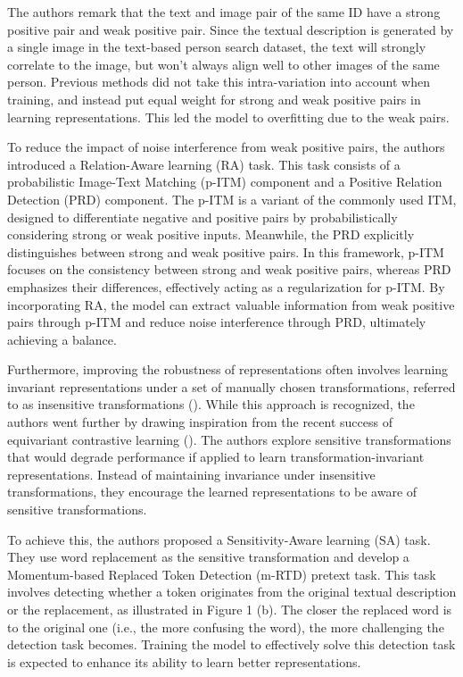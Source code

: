 The authors remark that the text and image pair of the same ID have a strong positive pair and weak positive pair. Since the textual description is generated by a single image in the text-based person search dataset, the text will strongly correlate to the image, but won't always align well to other images of the same person. Previous methods did not take this intra-variation into account when training, and instead put equal weight for strong and weak positive pairs in learning representations. This led the model to overfitting due to the weak pairs.

To reduce the impact of noise interference from weak positive pairs, the authors introduced a Relation-Aware learning (RA) task. This task consists of a probabilistic Image-Text Matching (p-ITM) component and a Positive Relation Detection (PRD) component. The p-ITM is a variant of the commonly used ITM, designed to differentiate negative and positive pairs by probabilistically considering strong or weak positive inputs. Meanwhile, the PRD explicitly distinguishes between strong and weak positive pairs. In this framework, p-ITM focuses on the consistency between strong and weak positive pairs, whereas PRD emphasizes their differences, effectively acting as a regularization for p-ITM. By incorporating RA, the model can extract valuable information from weak positive pairs through p-ITM and reduce noise interference through PRD, ultimately achieving a balance.

Furthermore, improving the robustness of representations often involves learning invariant representations under a set of manually chosen transformations, referred to as insensitive transformations (\cite{caron2021unsupervisedlearningvisualfeatures}). While this approach is recognized, the authors went further by drawing inspiration from the recent success of equivariant contrastive learning (\cite{dangovski2022equivariantcontrastivelearning}). The authors explore sensitive transformations that would degrade performance if applied to learn transformation-invariant representations. Instead of maintaining invariance under insensitive transformations, they encourage the learned representations to be aware of sensitive transformations. 

To achieve this, the authors proposed a Sensitivity-Aware learning (SA) task. They use word replacement as the sensitive transformation and develop a Momentum-based Replaced Token Detection (m-RTD) pretext task. This task involves detecting whether a token originates from the original textual description or the replacement, as illustrated in Figure 1 (b). The closer the replaced word is to the original one (i.e., the more confusing the word), the more challenging the detection task becomes. Training the model to effectively solve this detection task is expected to enhance its ability to learn better representations.

